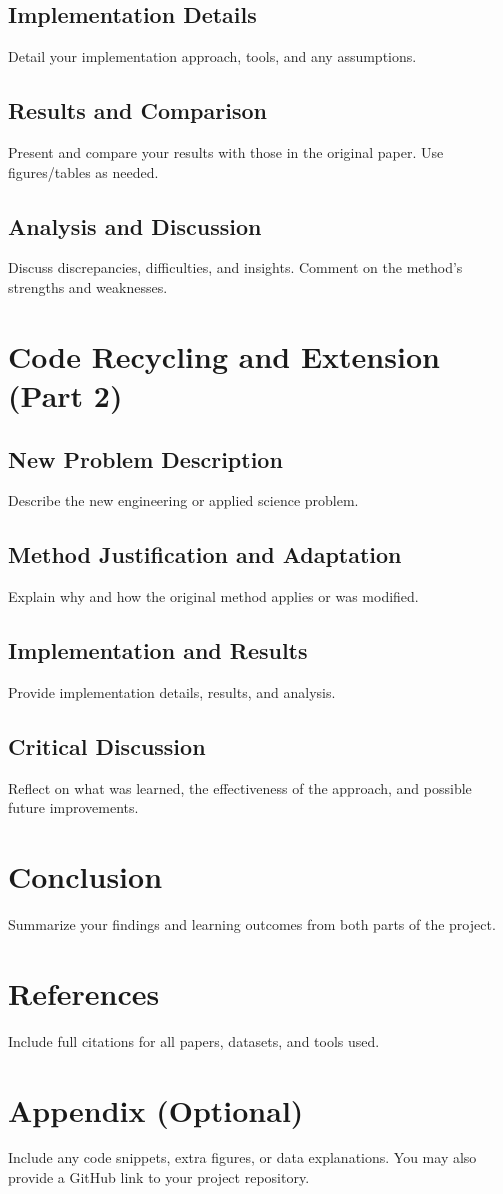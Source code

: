 \documentclass[12pt]{article}
\begin{document}
\subsection{Implementation Details}
Detail your implementation approach, tools, and any assumptions.

\subsection{Results and Comparison}
Present and compare your results with those in the original paper. Use figures/tables as needed.

\subsection{Analysis and Discussion}
Discuss discrepancies, difficulties, and insights. Comment on the method's strengths and weaknesses.

\section{Code Recycling and Extension (Part 2)}
\subsection{New Problem Description}
Describe the new engineering or applied science problem.

\subsection{Method Justification and Adaptation}
Explain why and how the original method applies or was modified.

\subsection{Implementation and Results}
Provide implementation details, results, and analysis.

\subsection{Critical Discussion}
Reflect on what was learned, the effectiveness of the approach, and possible future improvements.

\section{Conclusion}
Summarize your findings and learning outcomes from both parts of the project.

\section*{References}
Include full citations for all papers, datasets, and tools used.

\section*{Appendix (Optional)}
Include any code snippets, extra figures, or data explanations. You may also provide a GitHub link to your project repository.
\end{document}
